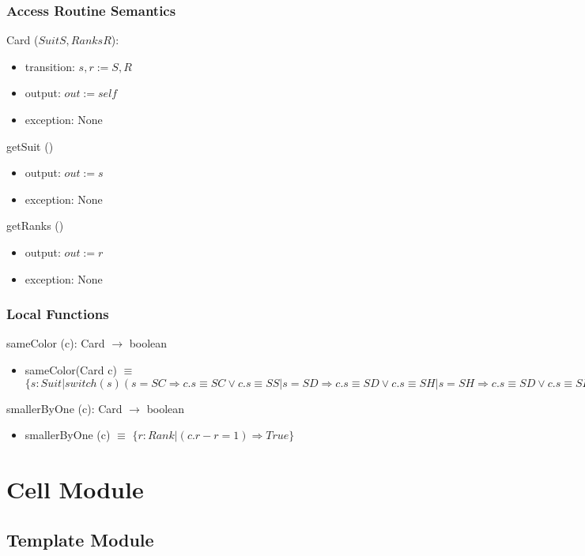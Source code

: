 \documentclass[12pt,fleqn]{article}
\begin{document}
\subsubsection* {Access Routine Semantics}

\noindent Card ($\mathit{Suit S},\mathit{Ranks R}$):
\begin{itemize}
\item transition: $s, r := S, R$
\item output: $out := \mathit{self}$
\item exception: None
\end{itemize}

\noindent getSuit ()
\begin{itemize}
\item output: $out := s$
\item exception: None
\end{itemize}

\noindent getRanks ()
\begin{itemize}
\item output: $out := r$
\item exception: None
\end{itemize}

\subsubsection*{Local Functions}

\noindent sameColor (c): Card $\rightarrow$ boolean
\begin{itemize}
\item sameColor(Card c) $\equiv$ $\{s : Suit | switch (s)(s = SC \Rightarrow c.s \equiv SC \lor c.s \equiv SS|s = SD \Rightarrow c.s \equiv SD \lor c.s \equiv SH|
s = SH \Rightarrow c.s \equiv SD \lor c.s \equiv SH| s = SS \Rightarrow c.s \equiv SC \lor c.s \equiv SS)\}$
\end{itemize}


\noindent smallerByOne (c): Card $\rightarrow$ boolean
\begin{itemize}
\item smallerByOne (c) $\equiv$ $\{r: Rank| (c.r - r = 1) \Rightarrow True\}$
\end{itemize}


\section* {Cell Module}

\subsection* {Template Module}
\end{document}
